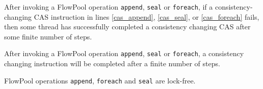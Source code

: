 \documentclass[runningheads,a4paper]{llncs}
\begin{document}
\begin{lemma}
After invoking a FlowPool operation \verb=append=, \verb=seal= or
\verb=foreach=, if a consistency-changing CAS instruction in lines
\ref{cas_append}, \ref{cas_seal}, or \ref{cas_foreach} fails, then some thread
has successfully completed a consistency changing CAS after some finite number
of steps.
\end{lemma}

\begin{lemma}
After invoking a FlowPool operation \verb=append=, \verb=seal= or
\verb=foreach=, a consistency changing instruction will be completed after 
a finite number of steps.
\end{lemma}


\begin{theorem}
FlowPool operations \verb=append=, \verb=foreach= and \verb=seal= are lock-free.
\end{theorem}


\smallrulenames
\end{document}
